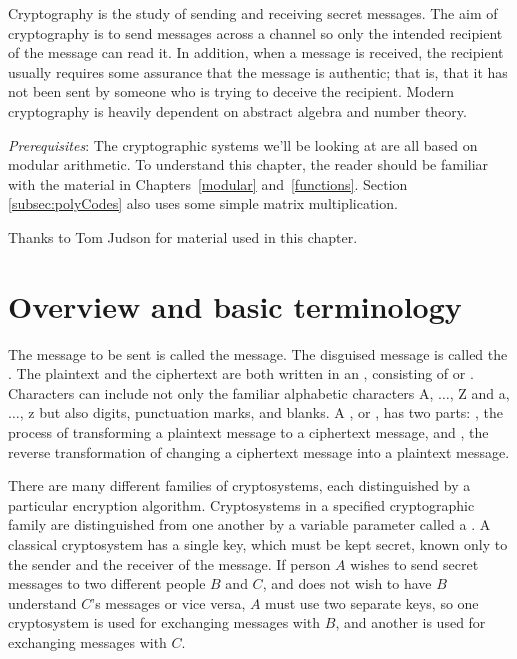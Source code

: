 
Cryptography is the study of sending and receiving secret messages.
The aim of cryptography is to send messages across a channel so only
the intended recipient of the message can read it. In addition, when a
message is received, the recipient usually requires some assurance that
the message is authentic; that is, that it has not been sent by
someone who is trying to deceive the recipient. Modern cryptography is
heavily dependent on abstract algebra and number theory. 
\medskip

\noindent
\emph{Prerequisites}: The cryptographic systems we'll be looking at are all based on modular arithmetic.
To understand this chapter, the reader should be familiar with the material in  Chapters~\ref{modular} and~\ref{functions}. Section \ref{subsec:polyCodes} also uses some simple matrix multiplication.
\bigskip

Thanks to Tom Judson for material used in this chapter.

\section{Overview and basic terminology}
\label{sec:Cryptography:Overview}

The message to be sent is called the  message. The disguised message is called
the . The plaintext and the
ciphertext are both written in an , consisting of  or . Characters can include not only the
familiar alphabetic characters A, $\ldots$, Z and a, $\ldots$, z but
also digits, punctuation marks, and blanks. A , or ,  has two parts: , the process
of transforming a plaintext message to a ciphertext message, and , the reverse transformation of changing a ciphertext
message into a plaintext message.
 
 
There are many different families of cryptosystems, each distinguished
by a particular encryption algorithm. Cryptosystems in a specified
cryptographic family are distinguished from one another by a variable parameter
called a . A classical cryptosystem has a single key, which must be kept
secret,  known only to the sender and the receiver of the message. If
person $A$ wishes to send secret messages to two different people $B$
and $C$, and does not wish to have $B$ understand $C$'s messages or
vice versa, $A$ must use two separate keys, so one cryptosystem is
used for exchanging messages with $B$, and another is used for
exchanging messages with $C$.
 
